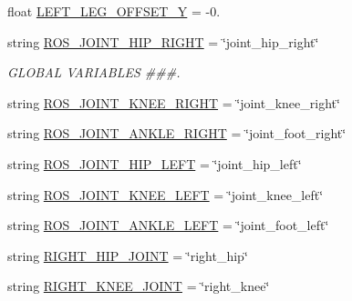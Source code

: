 \begin{DoxyCompactItemize}
\item 
float \mbox{\hyperlink{namespacecapture__pedal__trajectory__two__frames_ac25ca4f1c517edc53f011c510ce17420}{L\+E\+F\+T\+\_\+\+L\+E\+G\+\_\+\+O\+F\+F\+S\+E\+T\+\_\+Y}} = -\/0.
\item 
string \mbox{\hyperlink{namespacecapture__pedal__trajectory__two__frames_aaa15481baace9d82c9a27848a5be471f}{R\+O\+S\+\_\+\+J\+O\+I\+N\+T\+\_\+\+H\+I\+P\+\_\+\+R\+I\+G\+HT}} = \char`\"{}joint\+\_\+hip\+\_\+right\char`\"{}
\begin{DoxyCompactList}\small\item\em G\+L\+O\+B\+AL V\+A\+R\+I\+A\+B\+L\+ES \#\#\#. \end{DoxyCompactList}\item 
string \mbox{\hyperlink{namespacecapture__pedal__trajectory__two__frames_a9faf2220031dc432a84be8ff533821b4}{R\+O\+S\+\_\+\+J\+O\+I\+N\+T\+\_\+\+K\+N\+E\+E\+\_\+\+R\+I\+G\+HT}} = \char`\"{}joint\+\_\+knee\+\_\+right\char`\"{}
\item 
string \mbox{\hyperlink{namespacecapture__pedal__trajectory__two__frames_a192ccc6ec110e21da257c30322a1a4e1}{R\+O\+S\+\_\+\+J\+O\+I\+N\+T\+\_\+\+A\+N\+K\+L\+E\+\_\+\+R\+I\+G\+HT}} = \char`\"{}joint\+\_\+foot\+\_\+right\char`\"{}
\item 
string \mbox{\hyperlink{namespacecapture__pedal__trajectory__two__frames_afc4fec5302fa7ea46345653c074a9170}{R\+O\+S\+\_\+\+J\+O\+I\+N\+T\+\_\+\+H\+I\+P\+\_\+\+L\+E\+FT}} = \char`\"{}joint\+\_\+hip\+\_\+left\char`\"{}
\item 
string \mbox{\hyperlink{namespacecapture__pedal__trajectory__two__frames_a6ea7f54af0c464b475a2f1771fb294ff}{R\+O\+S\+\_\+\+J\+O\+I\+N\+T\+\_\+\+K\+N\+E\+E\+\_\+\+L\+E\+FT}} = \char`\"{}joint\+\_\+knee\+\_\+left\char`\"{}
\item 
string \mbox{\hyperlink{namespacecapture__pedal__trajectory__two__frames_aaa9aae16865de02bf6dcff08179b8ce5}{R\+O\+S\+\_\+\+J\+O\+I\+N\+T\+\_\+\+A\+N\+K\+L\+E\+\_\+\+L\+E\+FT}} = \char`\"{}joint\+\_\+foot\+\_\+left\char`\"{}
\item 
string \mbox{\hyperlink{namespacecapture__pedal__trajectory__two__frames_ae0c269441a8488829d0897e549486296}{R\+I\+G\+H\+T\+\_\+\+H\+I\+P\+\_\+\+J\+O\+I\+NT}} = \char`\"{}right\+\_\+hip\char`\"{}
\item 
string \mbox{\hyperlink{namespacecapture__pedal__trajectory__two__frames_ac8d93b4d694be72193eef42e1c2efb56}{R\+I\+G\+H\+T\+\_\+\+K\+N\+E\+E\+\_\+\+J\+O\+I\+NT}} = \char`\"{}right\+\_\+knee\char`\"{}
\item 

\end{DoxyCompactItemize}
